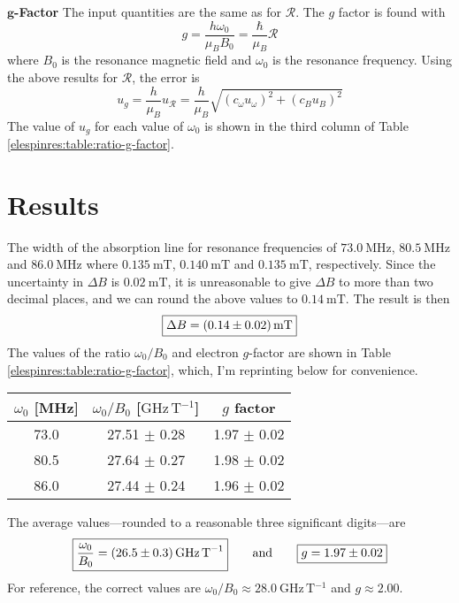 \documentclass[11pt, a4paper]{article}
\newcommand{\eqtext}[1]{\qquad \text{#1} \qquad}
\begin{document}
\vspace{3mm}
\textbf{$ \bm{g} $-Factor}
The input quantities are the same as for $ \mathcal{R} $. The $ g $ factor is found with
\begin{equation*}
	g = \frac{h \omega_{0}}{\mu_{B}B_{0}} = \frac{\hbar}{\mu_{B}} \mathcal{R}
\end{equation*}
where $ B_{0} $ is the resonance magnetic field and $ \omega_{0} $ is the resonance frequency. Using the above results for $ \mathcal{R} $, the error is
\begin{equation*}
	u_{g} = \frac{h}{\mu_{B}} u_{\mathcal{R}} = \frac{h}{\mu_{B}} \sqrt{(c_{\omega}u_{\omega})^{2} + (c_{B}u_{B})^{2}}
\end{equation*}
The value of $ u_{g} $ for each value of $ \omega_{0} $ is shown in the third column of Table \ref{elespinres:table:ratio-g-factor}.

\section{Results}
The width of the absorption line for resonance frequencies of $ \SI{73.0}{\mega \hertz} $, $ \SI{80.5}{\mega \hertz} $ and $ \SI{86.0}{\mega \hertz} $ where $ \SI{0.135}{\milli \tesla} $, $ \SI{0.140}{\milli \tesla} $ and $ \SI{0.135}{\milli \tesla} $, respectively. Since the uncertainty in $ \Delta B $ is $ \SI{0.02}{\milli \tesla} $, it is unreasonable to give $ \Delta B $ to more than two decimal places, and we can round the above values to $ \SI{0.14}{\milli \tesla} $. The result is then
\begin{equation*}
	\boxed{	\Delta B = \SI{0.14 \pm 0.02}{\milli \tesla}}
\end{equation*}
The values of the ratio $ \omega_{0} / B_{0}$ and electron $ g $-factor are shown in Table \ref{elespinres:table:ratio-g-factor}, which, I'm reprinting below for convenience.

\begin{table}[htb!]
\begin{center}
 \begin{tabular}{c|c|c}
     $ \omega_{0} $ [\si{\mega \hertz}] & $ \omega_{0}/B_{0} $ [$ \si{\giga \hertz\, \tesla^{-1}} $] & $ g $ factor  \\
     \hline
     73.0 & 27.51 $ \pm $ 0.28 & 1.97 $ \pm $ 0.02 \\
     80.5 & 27.64 $ \pm $ 0.27 & 1.98 $ \pm $ 0.02 \\
     86.0 & 27.44 $ \pm $ 0.24 & 1.96 $ \pm $ 0.02
	\end{tabular}
\end{center}
\end{table}
The average values---rounded to a reasonable three significant digits---are
\begin{equation*}
	\boxed{\frac{\omega_{0}}{B_{0}} = \SI{26.5 \pm 0.3}{\giga \hertz\, \tesla^{-1}}} \eqtext{and} \boxed{g = 1.97 \pm 0.02}
\end{equation*}
For reference, the correct values are $ \omega_{0}/ B_{0} \approx \SI{28.0}{\giga \hertz \, \tesla^{-1}} $ and $ g \approx 2.00 $. 
\end{document}
